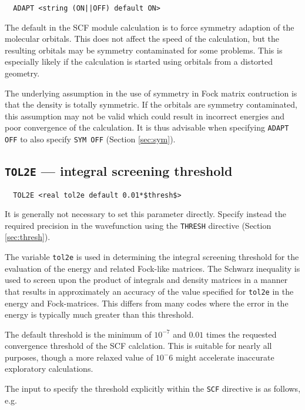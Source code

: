 \begin{verbatim}
  ADAPT <string (ON||OFF) default ON>
\end{verbatim}

The default in the SCF module calculation is to force symmetry
adaption of the molecular orbitals. This does not affect the speed of
the calculation, but the resulting orbitals may be symmetry
contaminated for some problems.  This is especially likely if the
calculation is started using orbitals from a distorted geometry.

The underlying assumption in the use of symmetry in Fock matrix
contruction is that the density is totally symmetric.  If the orbitals
are symmetry contaminated, this assumption may not be valid which
could result in incorrect energies and poor convergence of the
calculation.  It is thus advisable when specifying \verb+ADAPT OFF+ to
also specify \verb+SYM OFF+ (Section \ref{sec:sym}).

\subsection{{\tt TOL2E} --- integral screening threshold}
\label{sec:tol2e}

\begin{verbatim}
  TOL2E <real tol2e default 0.01*$thresh$>
\end{verbatim}

It is generally not necessary to set this parameter directly.  Specify
instead the required precision in the wavefunction using the
\verb+THRESH+ directive (Section \ref{sec:thresh}).

The variable \verb+tol2e+ is used in determining the integral
screening threshold for the evaluation of the energy and related
Fock-like matrices.  The Schwarz inequality is used to screen upon the
product of integrals and density matrices in a manner that results in
approximately an accuracy of the value specified for \verb+tol2e+ in
the energy and Fock-matrices.  This differs from many codes where the
error in the energy is typically much greater than this threshold.

The default threshold is the minimum of $10^{-7}$ and $0.01$ times the
requested convergence threshold of the SCF calclation.  This is
suitable for nearly all purposes, though a more relaxed value of 
$10^-6$ might accelerate inaccurate exploratory calculations.

The input to specify the threshold explicitly within the
\verb+SCF+ directive is as follows, e.g.

